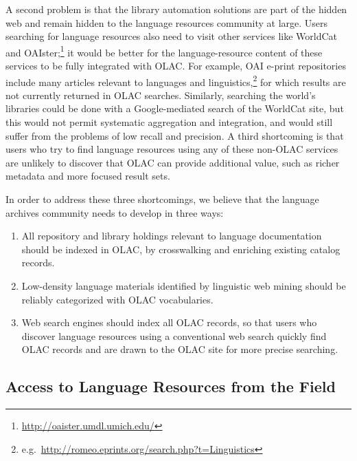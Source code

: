 A second problem is that the library automation solutions are part of
the hidden web and remain hidden to the language resources community
at large.
Users searching for language
resources also need to visit other services like WorldCat and OAIster;\footnote{\scriptsize\url{http://oaister.umdl.umich.edu/}}
it would be better for the language-resource content
of these services to be fully integrated with OLAC.
For example, OAI e-print repositories include many articles
relevant to languages and linguistics,\footnote{e.g.\ \small\url{http://romeo.eprints.org/search.php?t=Linguistics}}
for which results are not currently returned in OLAC searches.
Similarly, searching the world's libraries could be done with a
Google-mediated search of the WorldCat site, but this would not
permit systematic aggregation and integration, and would still suffer
from the problems of low recall and precision.
A third shortcoming is that users who try to find language resources
using any of these non-OLAC services are unlikely to discover that
OLAC can provide additional value, such as richer metadata and more
focused result sets.


In order to address these three shortcomings, we believe that the
language archives community needs to develop in three ways:

\begin{enumerate}\setlength{\itemsep}{0pt}
\item All repository and library holdings relevant to language
      documentation should be indexed in OLAC, by
      crosswalking and enriching existing catalog records.
\item Low-density language materials identified by linguistic web mining
      should be reliably categorized with OLAC vocabularies.
\item Web search engines should index all OLAC records, so that
      users who discover language resources using a conventional 
      web search quickly find OLAC records and are drawn to the
      OLAC site for more precise searching.
\end{enumerate}

\subsection{Access to Language Resources from the Field}

